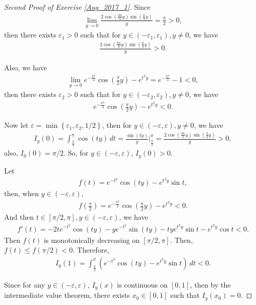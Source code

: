 \documentclass[11pt]{article}
\theoremstyle{definition}
\numberwithin{equation}{subsection}
\begin{document}
\begin{proof}[Second Proof of Exercise \ref{Aug_2017_1}]
Since 
\begin{align*}
    \lim_{y \to 0} \frac{2 \cos \left(\frac{3\pi}{4}y\right) \sin \left(\frac{\pi}{4}y\right)}{y} = \frac{\pi}{2} > 0,
\end{align*}
then there exists $\varepsilon_1 > 0$ such that for $y \in (-\varepsilon_1, \varepsilon_1), y \neq 0$, we have
\begin{align*}
    \frac{2 \cos \left(\frac{3\pi}{4}y\right) \sin \left(\frac{\pi}{4}y\right)}{y} > 0.
\end{align*}

Also, we have
\begin{align*}
    \lim_{y \to 0} e^{-\frac{\pi^2}{4}} \cos \left(\frac{\pi}{2} y\right) - e^{t^2 y} = e^{-\frac{\pi^2}{4}} - 1 < 0,
\end{align*}
then there exists $\varepsilon_2 > 0$ such that for $y \in (-\varepsilon_2, \varepsilon_2), y \neq 0$, we have
\begin{align*}
    e^{-\frac{\pi^2}{4}} \cos \left(\frac{\pi}{2} y\right) - e^{t^2 y} < 0.
\end{align*}

Now let $\varepsilon = \min\left\{\varepsilon_1, \varepsilon_2, 1/2 \right\}$, then for $y \in (-\varepsilon, \varepsilon), y \neq 0$, we have
\begin{align*}
    I_y(0) = \int^{\pi}_{\frac{\pi}{2}} \cos (ty) \, dt = \frac{\sin(ty)}{y} \Bigg|^{\pi}_{\frac{\pi}{2}} = \frac{2 \cos \left(\frac{3\pi}{4}y\right) \sin \left(\frac{\pi}{4}y\right)}{y} > 0,
\end{align*}
also, $I_0(0) = \pi/2$. So, for $y \in (-\varepsilon, \varepsilon)$, $I_y(0) > 0$.

Let 
\begin{align*}
    f(t) = e^{-t^2} \cos (ty) - e^{t^2 y} \sin t,
\end{align*}
then, when $y \in (-\varepsilon, \varepsilon)$,
\begin{align*}
    f\left(\frac{\pi}{2}\right) = e^{-\frac{\pi^2}{4}} \cos \left(\frac{\pi}{2} y\right) - e^{t^2 y} < 0.
\end{align*}
And then $t \in [\pi/2, \pi], y \in (-\varepsilon, \varepsilon)$, we have
\begin{align*}
    f'(t) = - 2t e^{-t^2} \cos (ty) - y e^{-t^2} \sin (ty) - ty e^{t^2y} \sin t - e^{t^2 y} \cos t < 0.
\end{align*}
Then $f(t)$ is monotonically decreasing on $[\pi/2, \pi]$. Then, $f(t) \leq f(\pi/2) < 0$. Therefore, 
\begin{align*}
    I_y(1) = \int^{\pi}_{\frac{\pi}{2}} \left( e^{-t^2} \cos (ty) - e^{t^2 y} \sin t \right)\, dt < 0.
\end{align*}

Since for any $y \in (-\varepsilon, \varepsilon)$, $I_y(x)$ is continuous on $[0,1]$, then by the intermediate value theorem, there exists $x_0 \in [0,1]$ such that $I_y(x_0) = 0$.
\end{proof}
\end{document}
